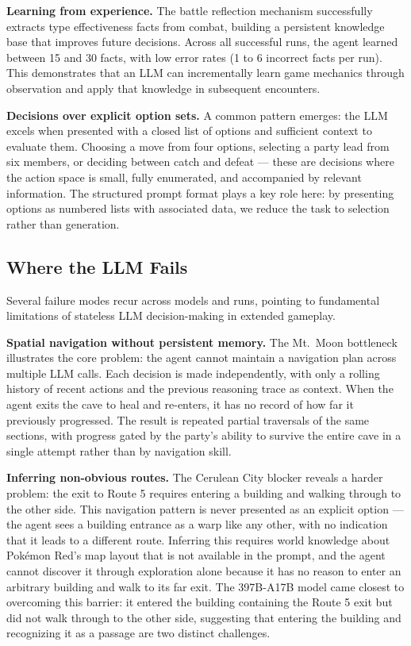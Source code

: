 \documentclass{article}
\begin{document}
\textbf{Learning from experience.} The battle reflection mechanism successfully extracts type effectiveness facts from combat, building a persistent knowledge base that improves future decisions. Across all successful runs, the agent learned between 15 and 30 facts, with low error rates (1 to 6 incorrect facts per run). This demonstrates that an LLM can incrementally learn game mechanics through observation and apply that knowledge in subsequent encounters.

\textbf{Decisions over explicit option sets.} A common pattern emerges: the LLM excels when presented with a closed list of options and sufficient context to evaluate them. Choosing a move from four options, selecting a party lead from six members, or deciding between catch and defeat --- these are decisions where the action space is small, fully enumerated, and accompanied by relevant information. The structured prompt format plays a key role here: by presenting options as numbered lists with associated data, we reduce the task to selection rather than generation.

\subsection{Where the LLM Fails}

Several failure modes recur across models and runs, pointing to fundamental limitations of stateless LLM decision-making in extended gameplay.

\textbf{Spatial navigation without persistent memory.} The Mt.\ Moon bottleneck illustrates the core problem: the agent cannot maintain a navigation plan across multiple LLM calls. Each decision is made independently, with only a rolling history of recent actions and the previous reasoning trace as context. When the agent exits the cave to heal and re-enters, it has no record of how far it previously progressed. The result is repeated partial traversals of the same sections, with progress gated by the party's ability to survive the entire cave in a single attempt rather than by navigation skill.

\textbf{Inferring non-obvious routes.} The Cerulean City blocker reveals a harder problem: the exit to Route 5 requires entering a building and walking through to the other side. This navigation pattern is never presented as an explicit option --- the agent sees a building entrance as a warp like any other, with no indication that it leads to a different route. Inferring this requires world knowledge about Pok\'{e}mon Red's map layout that is not available in the prompt, and the agent cannot discover it through exploration alone because it has no reason to enter an arbitrary building and walk to its far exit. The 397B-A17B model came closest to overcoming this barrier: it entered the building containing the Route 5 exit but did not walk through to the other side, suggesting that entering the building and recognizing it as a passage are two distinct challenges.
\end{document}
